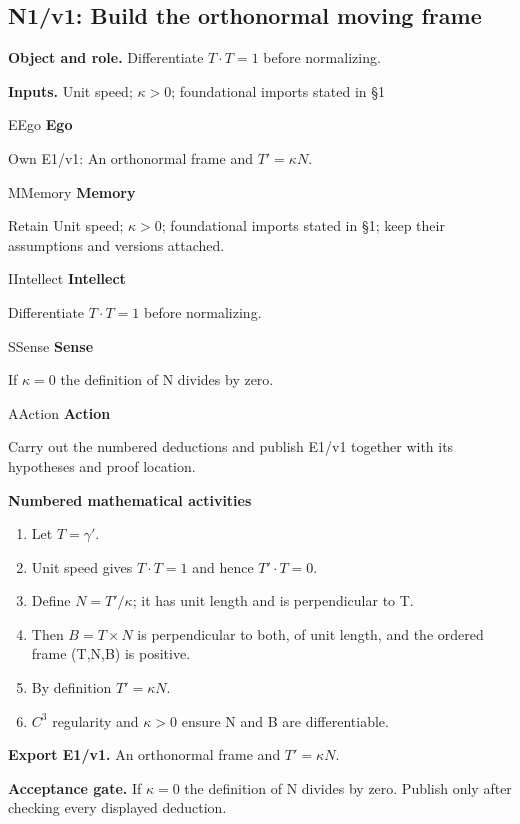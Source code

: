 \documentclass[preprint,12pt,aps,pra,showkeys,amsmath,amssymb,superscriptaddress,floatfix]{revtex4-2}
\theoremstyle{definition}
\theoremstyle{remark}
\newcommand{\mmfaculty}[3]{%
 \begin{mmfacultybox}{#1}{#2}
 {\sffamily\bfseries\color{MMBlue}#2}\par\smallskip #3
 \end{mmfacultybox}}
\newcommand{\field}[2]{\par\smallskip\noindent\textbf{#1.} #2\par}
\begin{document}
\subsection{N1/v1: Build the orthonormal moving frame}

\field{Object and role}{Differentiate \(T\cdot T=1\) before normalizing.}

\field{Inputs}{Unit speed; \(\kappa >0\); foundational imports stated in §1}

\mmfaculty{E}{Ego}{Own E1/v1: An orthonormal frame and \(T'=\kappa N\).}

\mmfaculty{M}{Memory}{Retain Unit speed; \(\kappa >0\); foundational imports stated in §1;
keep their assumptions and versions attached.}

\mmfaculty{I}{Intellect}{Differentiate \(T\cdot T=1\) before normalizing.}

\mmfaculty{S}{Sense}{If \(\kappa =0\) the definition of N divides by zero.}

\mmfaculty{A}{Action}{Carry out the numbered deductions and publish E1/v1 together with its
hypotheses and proof location.}

\smallskip\noindent\textbf{Numbered mathematical activities}

\begin{enumerate}[label=N1.\arabic*,leftmargin=3.4em]

\item Let \(T=\gamma '\).

\item Unit speed gives \(T\cdot T=1\) and hence \(T'\cdot T=0\).

\item Define \(N=T'/\kappa\); it has unit length and is perpendicular to T.

\item Then \(B=T\times N\) is perpendicular to both, of unit length, and the
ordered frame (T,N,B) is positive.

\item By definition \(T'=\kappa N\).

\item \(C^{3}\) regularity and \(\kappa >0\) ensure N and B are
differentiable.

\end{enumerate}

\field{Export E1/v1}{An orthonormal frame and \(T'=\kappa N\).}

\field{Acceptance gate}{If \(\kappa =0\) the definition of N divides by zero. Publish only after
checking every displayed deduction.}
\end{document}
